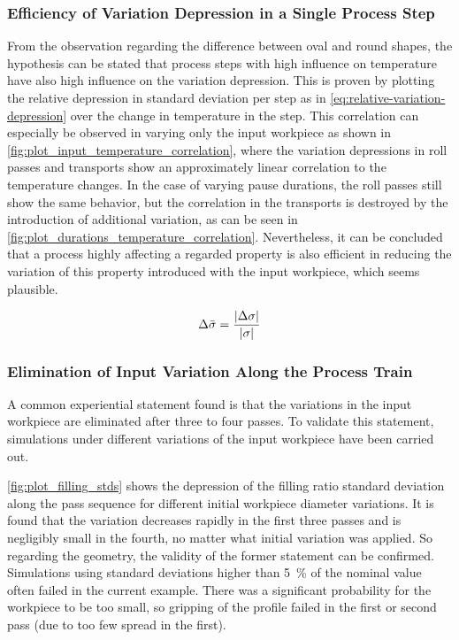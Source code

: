 \subsubsection{Efficiency of Variation Depression in a Single Process Step}

From the observation regarding the difference between oval and round shapes, the hypothesis can be stated that process steps with high influence on temperature have also high influence on the variation depression.
This is proven by plotting the relative depression in standard deviation per step as in \autoref{eq:relative-variation-depression} over the change in temperature in the step.
This correlation can especially be observed in varying only the input workpiece as shown in \autoref{fig:plot_input_temperature_correlation}, where the variation depressions in roll passes and transports show an approximately linear correlation to the temperature changes.
In the case of varying pause durations, the roll passes still show the same behavior, but the correlation in the transports is destroyed by the introduction of additional variation, as can be seen in \autoref{fig:plot_durations_temperature_correlation}.
Nevertheless, it can be concluded that a process highly affecting a regarded property is also efficient in reducing the variation of this property introduced with the input workpiece, which seems plausible.

\begin{equation}
    \Delta\bar{\sigma} = \frac{\lvert \Delta \sigma \rvert}{\lvert \sigma \rvert}
    \label{eq:relative-variation-depression}
\end{equation}

\subsubsection{Elimination of Input Variation Along the Process Train}

A common experiential statement found is that the variations in the input workpiece are eliminated after three to four passes.
To validate this statement, simulations under different variations of the input workpiece have been carried out.

\autoref{fig:plot_filling_stds} shows the depression of the filling ratio standard deviation along the pass sequence for different initial workpiece diameter variations.
It is found that the variation decreases rapidly in the first three passes and is negligibly small in the fourth, no matter what initial variation was applied.
So regarding the geometry, the validity of the former statement can be confirmed.
Simulations using standard deviations higher than \qty{5}{\percent} of the nominal value often failed in the current example.
There was a significant probability for the workpiece to be too small, so gripping of the profile failed in the first or second pass (due to too few spread in the first).

